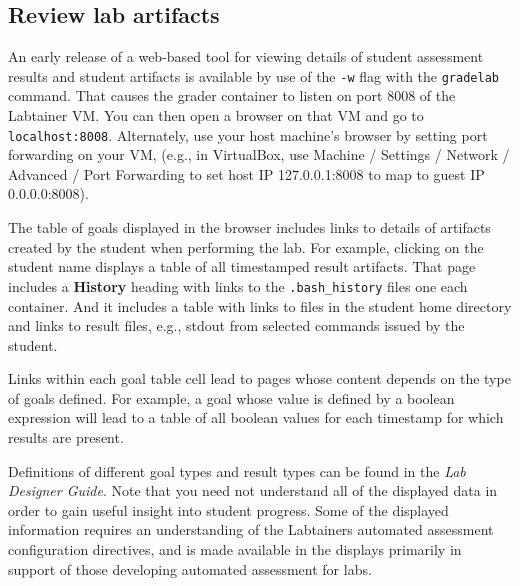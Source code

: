\documentclass[12pt]{article}
\begin{document}
\subsection{Review lab artifacts}
\label{review-artifacts}
An early release of a web-based tool for viewing details of student assessment
results and student artifacts is available by use of the {\tt -w} flag with the {\tt gradelab} command.  That causes
the grader container to listen on port 8008 of the Labtainer VM.  You can then open
a browser on that VM and go to {\tt localhost:8008}.  Alternately, use your host machine's browser
by setting port forwarding on your VM, (e.g., in VirtualBox, use Machine / Settings / Network / Advanced /
Port Forwarding to set host IP 127.0.0.1:8008 to map to guest IP 0.0.0.0:8008).

The table of goals displayed in the browser includes links to details of artifacts
created by the student when performing the lab.  For example, clicking on the student name displays a table
of all timestamped result artifacts.  That page includes a \textbf{History} heading with links to the
{\tt .bash\_history} files one each container.  And it includes a table with links to files in the student home directory
and links to result files, e.g., stdout from selected commands issued by the student. 

Links within each goal table cell lead to pages whose content depends on the type of goals defined.  For example,
a goal whose value is defined by a boolean expression will lead to a table of all boolean values for each timestamp
for which results are present.

Definitions of different goal types and result types can be found in the \textit{Lab Designer Guide}.  Note that you need
not understand all of the displayed data in order to gain useful insight into student progress.  Some of the displayed information
requires an understanding of the Labtainers automated assessment configuration directives, and is made available in the displays 
primarily in support of those developing automated assessment for labs.
\end{document}
